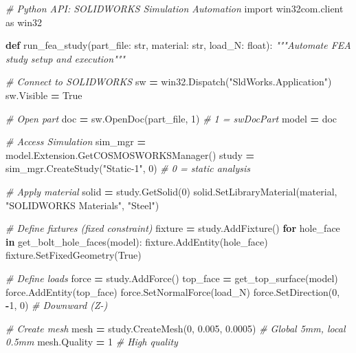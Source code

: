 \documentclass[
]{article}
\newenvironment{Shaded}{\begin{snugshade}}{\end{snugshade}}
\newcommand{\BuiltInTok}[1]{#1}
\newcommand{\CommentTok}[1]{\textcolor[rgb]{0.56,0.35,0.01}{\textit{#1}}}
\newcommand{\ControlFlowTok}[1]{\textcolor[rgb]{0.13,0.29,0.53}{\textbf{#1}}}
\newcommand{\DecValTok}[1]{\textcolor[rgb]{0.00,0.00,0.81}{#1}}
\newcommand{\FloatTok}[1]{\textcolor[rgb]{0.00,0.00,0.81}{#1}}
\newcommand{\ImportTok}[1]{#1}
\newcommand{\KeywordTok}[1]{\textcolor[rgb]{0.13,0.29,0.53}{\textbf{#1}}}
\newcommand{\NormalTok}[1]{#1}
\newcommand{\OperatorTok}[1]{\textcolor[rgb]{0.81,0.36,0.00}{\textbf{#1}}}
\newcommand{\StringTok}[1]{\textcolor[rgb]{0.31,0.60,0.02}{#1}}
\newcommand{\VariableTok}[1]{\textcolor[rgb]{0.00,0.00,0.00}{#1}}
\begin{document}
\begin{Shaded}
\begin{Highlighting}[]
\CommentTok{\# Python API: SOLIDWORKS Simulation Automation}
\ImportTok{import}\NormalTok{ win32com.client }\ImportTok{as}\NormalTok{ win32}

\KeywordTok{def}\NormalTok{ run\_fea\_study(part\_file: }\BuiltInTok{str}\NormalTok{, material: }\BuiltInTok{str}\NormalTok{, load\_N: }\BuiltInTok{float}\NormalTok{):}
    \CommentTok{"""Automate FEA study setup and execution"""}

    \CommentTok{\# Connect to SOLIDWORKS}
\NormalTok{    sw }\OperatorTok{=}\NormalTok{ win32.Dispatch(}\StringTok{"SldWorks.Application"}\NormalTok{)}
\NormalTok{    sw.Visible }\OperatorTok{=} \VariableTok{True}

    \CommentTok{\# Open part}
\NormalTok{    doc }\OperatorTok{=}\NormalTok{ sw.OpenDoc(part\_file, }\DecValTok{1}\NormalTok{)  }\CommentTok{\# 1 = swDocPart}
\NormalTok{    model }\OperatorTok{=}\NormalTok{ doc}

    \CommentTok{\# Access Simulation}
\NormalTok{    sim\_mgr }\OperatorTok{=}\NormalTok{ model.Extension.GetCOSMOSWORKSManager()}
\NormalTok{    study }\OperatorTok{=}\NormalTok{ sim\_mgr.CreateStudy(}\StringTok{"Static{-}1"}\NormalTok{, }\DecValTok{0}\NormalTok{)  }\CommentTok{\# 0 = static analysis}

    \CommentTok{\# Apply material}
\NormalTok{    solid }\OperatorTok{=}\NormalTok{ study.GetSolid(}\DecValTok{0}\NormalTok{)}
\NormalTok{    solid.SetLibraryMaterial(material, }\StringTok{"SOLIDWORKS Materials"}\NormalTok{, }\StringTok{"Steel"}\NormalTok{)}

    \CommentTok{\# Define fixtures (fixed constraint)}
\NormalTok{    fixture }\OperatorTok{=}\NormalTok{ study.AddFixture()}
    \ControlFlowTok{for}\NormalTok{ hole\_face }\KeywordTok{in}\NormalTok{ get\_bolt\_hole\_faces(model):}
\NormalTok{        fixture.AddEntity(hole\_face)}
\NormalTok{    fixture.SetFixedGeometry(}\VariableTok{True}\NormalTok{)}

    \CommentTok{\# Define loads}
\NormalTok{    force }\OperatorTok{=}\NormalTok{ study.AddForce()}
\NormalTok{    top\_face }\OperatorTok{=}\NormalTok{ get\_top\_surface(model)}
\NormalTok{    force.AddEntity(top\_face)}
\NormalTok{    force.SetNormalForce(load\_N)}
\NormalTok{    force.SetDirection(}\DecValTok{0}\NormalTok{, }\OperatorTok{{-}}\DecValTok{1}\NormalTok{, }\DecValTok{0}\NormalTok{)  }\CommentTok{\# Downward (Z{-})}

    \CommentTok{\# Create mesh}
\NormalTok{    mesh }\OperatorTok{=}\NormalTok{ study.CreateMesh(}\DecValTok{0}\NormalTok{, }\FloatTok{0.005}\NormalTok{, }\FloatTok{0.0005}\NormalTok{)  }\CommentTok{\# Global 5mm, local 0.5mm}
\NormalTok{    mesh.Quality }\OperatorTok{=} \DecValTok{1}  \CommentTok{\# High quality}


\end{Highlighting}
\end{Shaded}
\end{document}
